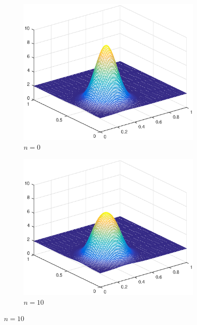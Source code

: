 \begin{figure}[h!]
    \centering
    \begin{subfigure}[t]{0.4\textwidth}
        \centering
        \includegraphics[width=\textwidth]{images/sol_ds_0000_per.eps}
        \caption{$n=0$}
        \label{fig:0}
    \end{subfigure}
    \begin{subfigure}[t]{0.48\textwidth}
        \centering
        \includegraphics[width=\textwidth]{images/sol_ds_0010_per.eps}
        \caption{$n=10$}
        \label{fig:10}
    \end{subfigure}

\end{figure}
